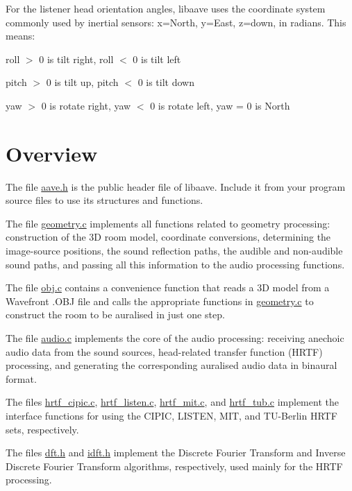 For the listener head orientation angles, libaave uses the coordinate system commonly used by inertial sensors\-: x=North, y=East, z=down, in radians. This means\-:
\begin{DoxyItemize}
\item roll $>$ 0 is tilt right, roll $<$ 0 is tilt left
\item pitch $>$ 0 is tilt up, pitch $<$ 0 is tilt down
\item yaw $>$ 0 is rotate right, yaw $<$ 0 is rotate left, yaw = 0 is North
\end{DoxyItemize}\hypertarget{index_overview}{}\section{Overview}\label{index_overview}
The file \hyperlink{aave_8h}{aave.\-h} is the public header file of libaave. Include it from your program source files to use its structures and functions.

The file \hyperlink{geometry_8c}{geometry.\-c} implements all functions related to geometry processing\-: construction of the 3\-D room model, coordinate conversions, determining the image-\/source positions, the sound reflection paths, the audible and non-\/audible sound paths, and passing all this information to the audio processing functions.

The file \hyperlink{obj_8c}{obj.\-c} contains a convenience function that reads a 3\-D model from a Wavefront .O\-B\-J file and calls the appropriate functions in \hyperlink{geometry_8c}{geometry.\-c} to construct the room to be auralised in just one step.

The file \hyperlink{audio_8c}{audio.\-c} implements the core of the audio processing\-: receiving anechoic audio data from the sound sources, head-\/related transfer function (H\-R\-T\-F) processing, and generating the corresponding auralised audio data in binaural format.

The files \hyperlink{hrtf__cipic_8c}{hrtf\-\_\-cipic.\-c}, \hyperlink{hrtf__listen_8c}{hrtf\-\_\-listen.\-c}, \hyperlink{hrtf__mit_8c}{hrtf\-\_\-mit.\-c}, and \hyperlink{hrtf__tub_8c}{hrtf\-\_\-tub.\-c} implement the interface functions for using the C\-I\-P\-I\-C, L\-I\-S\-T\-E\-N, M\-I\-T, and T\-U-\/\-Berlin H\-R\-T\-F sets, respectively.

The files \hyperlink{dft_8h}{dft.\-h} and \hyperlink{idft_8h}{idft.\-h} implement the Discrete Fourier Transform and Inverse Discrete Fourier Transform algorithms, respectively, used mainly for the H\-R\-T\-F processing.

